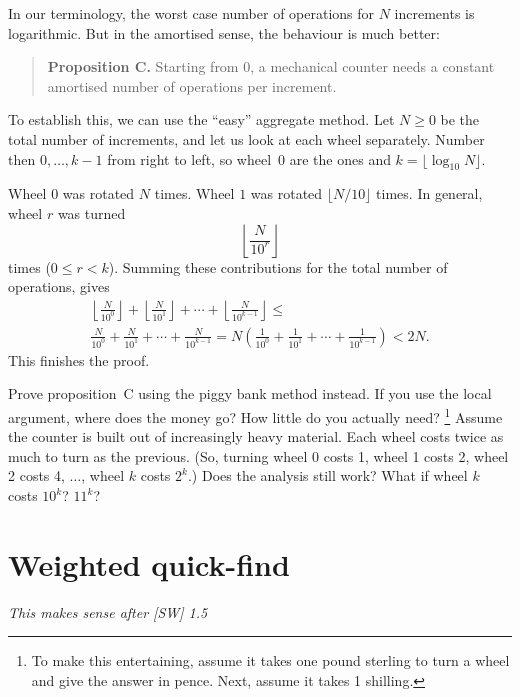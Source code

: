 \documentclass{tufte-handout}
\begin{document}
In our terminology, the worst case number of operations for $N$
increments is logarithmic. But in the amortised sense, the behaviour
is much better:

\begin{quote}
  {\bf Proposition C.}  Starting from 0, a mechanical counter needs a
  constant amortised number of operations per increment.
\end{quote}

To establish this, we can use the ``easy'' aggregate method. Let
$N\geq 0$
be the total number of increments, and let us look at each wheel
separately. Number then $0,\ldots, k-1$ from right to left, so wheel~$0$
are the ones and $k=\lfloor \log_{10} N\rfloor$.

Wheel $0$ was rotated $N$ times. Wheel $1$ was rotated $\lfloor
N/10\rfloor$ times. In general, wheel $r$ was turned \[ \left \lfloor
\frac{N}{10^r} \right\rfloor\] times ($0\leq r < k$). Summing these
contributions for the total number of operations, gives 
\begin{multline*}
 \left \lfloor
\frac{N}{10^0} \right\rfloor +
 \left \lfloor
\frac{N}{10^1} \right\rfloor +
\cdots +
 \left \lfloor
\frac{N}{10^{k-1}} \right\rfloor
\leq \\
\frac{N}{10^0} +
\frac{N}{10^1} +
\cdots +
\frac{N}{10^{k-1}} 
=
N\left(\frac{1}{10^0}+\frac{1}{10^1}+\cdots+\frac{1}{10^{k-1}} \right)
< 2N.
\end{multline*}
This finishes the proof.

\begin{ExerciseList}\small
\Exercise
Prove proposition~C using the piggy bank method instead.
If you use the local argument, where does the money go?
How little do you actually need?
\footnote{To make this entertaining, assume it takes one pound
  sterling to turn a wheel and give the answer in pence.
  Next, assume it takes 1 shilling.}
\Exercise
 Assume the counter is built out of increasingly heavy material. 
 Each wheel costs twice as much to turn as the previous.
 (So, turning wheel 0 costs 1, wheel 1 costs 2, wheel 2 costs 4, 
 $\ldots$,  wheel $k$ costs $2^k$.)
 Does the analysis still work?
 What if wheel $k$ costs $10^k$? $11^k$?
\end{ExerciseList}

\section{Weighted quick-find}

\emph{This makes sense after [SW] 1.5}
\end{document}
